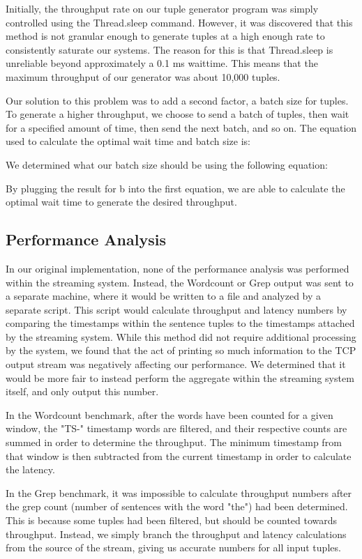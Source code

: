 Initially, the throughput rate on our tuple generator program was simply controlled using the Thread.sleep command.  However, it was discovered that this method is not granular enough to generate tuples at a high enough rate to consistently saturate our systems.  The reason for this is that Thread.sleep is unreliable beyond approximately a 0.1 ms waittime.  This means that the maximum throughput of our generator was about 10,000 tuples.

Our solution to this problem was to add a second factor, a batch size for tuples.  To generate a higher throughput, we choose to send a batch of tuples, then wait for a specified amount of time, then send the next batch, and so on.  The equation used to calculate the optimal wait time and batch size is:


We determined what our batch size should be using the following equation:


By plugging the result for {b} into the first equation, we are able to calculate the optimal wait time to generate the desired throughput.

\subsection{Performance Analysis}
In our original implementation, none of the performance analysis was performed within the streaming system.  Instead, the Wordcount or Grep output was sent to a separate machine, where it would be written to a file and analyzed by a separate script.  This script would calculate throughput and latency numbers by comparing the timestamps within the sentence tuples to the timestamps attached by the streaming system.  While this method did not require additional processing by the system, we found that the act of printing so much information to the TCP output stream was negatively affecting our performance.  We determined that it would be more fair to instead perform the aggregate within the streaming system itself, and only output this number.

In the Wordcount benchmark, after the words have been counted for a given window, the "TS-" timestamp words are filtered, and their respective counts are summed in order to determine the throughput.  The minimum timestamp from that window is then subtracted from the current timestamp in order to calculate the latency.

In the Grep benchmark, it was impossible to calculate throughput numbers after the grep count (number of sentences with the word "the") had been determined.  This is because some tuples had been filtered, but should be counted towards throughput.  Instead, we simply branch the throughput and latency calculations from the source of the stream, giving us accurate numbers for all input tuples.